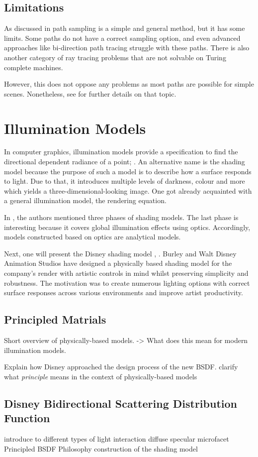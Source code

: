 \subsection{Limitations}

As discussed in \cite{veach_robust_1997} path sampling is a simple and general method, but it has some limits.
Some paths do not have a correct sampling option, and even advanced approaches like bi-direction path tracing struggle with these paths.
There is also another category of ray tracing problems that are not solvable on Turing complete machines.

However, this does not oppose any problems as most paths are possible for simple scenes.
Nonetheless, see \cite{veach_robust_1997} for further details on that topic.

\section{Illumination Models}

In computer graphics, illumination models provide a specification to find the directional dependent radiance of a point; \cite{duin_beleuchtungsalgorithmen_1993}. 
An alternative name is the shading model because the purpose of such a model is to describe how a surface responds to light.
Due to that, it introduces multiple levels of darkness, colour and more which yields a three-dimensional-looking image.
One got already acquainted with a general illumination model, the rendering equation.

In \cite{duin_beleuchtungsalgorithmen_1993}, the authors mentioned three phases of shading models.
The last phase is interesting because it covers global illumination effects using optics.
Accordingly, models constructed based on optics are analytical models.

Next, one will present the Disney shading model \cite{burley_physically_2012}, \cite{burley_extending_2015}.
Burley and Walt Disney Animation Studios have designed a physically based shading model for the company's render with artistic controls in mind whilst preserving simplicity and robustness.
The motivation was to create numerous lighting options with correct surface responses across various environments and improve artist productivity.

\subsection{Principled Matrials}

Short overview of physically-based models.
-> What does this mean for modern illumination models.

Explain how Disney approached the design process of the new BSDF.
clarify what \textit{principle} means in the context of physically-based models

\subsection{Disney Bidirectional Scattering Distribution Function}

introduce to different types of light interaction
diffuse
specular
microfacet
Principled BSDF
Philosophy
construction of the shading model
